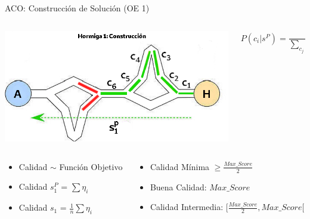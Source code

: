 \begin{frame}{ACO: Construcci\'on de Soluci\'on (OE 1)}
    \begin{columns}
        \begin{column}{0.7\textwidth}
            \centering
            \includegraphics[scale=0.4]{Pictures/ACO-ant-Constr-choices.png}
        \end{column}
        \begin{column}{0.3\textwidth}
            \begin{equation}
            P(c_{i} | s^{P}) = \frac
            {\tau_{i} ~ \eta_{i}}
            {\sum\limits_{c_{j}\in N(s^p)}{\tau_{j} ~ \eta_{j} } } %
            \label{eq:antProbabilities}
            \end{equation}
        \end{column}
    \end{columns}

    \begin{columns}
        \begin{column}{0.35\textwidth}
            \begin{itemize}
                \item Calidad $\sim$ Funci\'on Objetivo 
                \item Calidad $s^{P}_1$ = $\sum \eta_{i}$
                \item Calidad $s_1$ = $\frac{1}{n}\sum \eta_{i} $
            \end{itemize}
        \end{column}
        \begin{column}{0.65\textwidth}
            \begin{itemize}%
                \item Calidad M\'inima $\geq \frac{Max\_Score}{2}$
                \item Buena Calidad: $Max\_Score$
                \item Calidad Intermedia: $[\frac{Max\_Score}{2}, Max\_Score[$
            \end{itemize}
        \end{column}
    \end{columns}
\end{frame}

